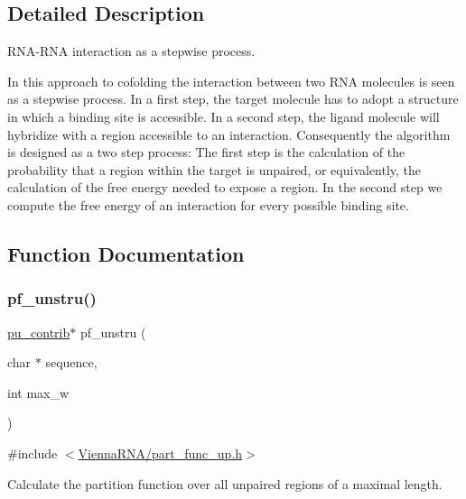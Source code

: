 \subsection{Detailed Description}
R\+N\+A-\/\+R\+NA interaction as a stepwise process. 

In this approach to cofolding the interaction between two R\+NA molecules is seen as a stepwise process. In a first step, the target molecule has to adopt a structure in which a binding site is accessible. In a second step, the ligand molecule will hybridize with a region accessible to an interaction. Consequently the algorithm is designed as a two step process\+: The first step is the calculation of the probability that a region within the target is unpaired, or equivalently, the calculation of the free energy needed to expose a region. In the second step we compute the free energy of an interaction for every possible binding site. 

\subsection{Function Documentation}
\mbox{\label{group__up__cofold_ga5b4ee40e190d2f633cd01cf0d2fe93cf}} 
\subsubsection{\texorpdfstring{pf\+\_\+unstru()}{pf\_unstru()}}
{\footnotesize\ttfamily \hyperlink{group__data__structures_structpu__contrib}{pu\+\_\+contrib}$\ast$ pf\+\_\+unstru (\begin{DoxyParamCaption}\item[{char $\ast$}]{sequence,  }\item[{int}]{max\+\_\+w }\end{DoxyParamCaption})}



{\ttfamily \#include $<$\hyperlink{part__func__up_8h}{Vienna\+R\+N\+A/part\+\_\+func\+\_\+up.\+h}$>$}



Calculate the partition function over all unpaired regions of a maximal length. 

